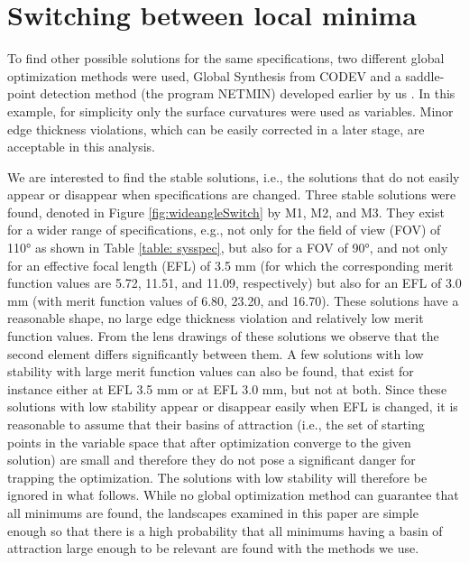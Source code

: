 \section{Switching between local minima}

To find other possible solutions for the same specifications, two different global optimization methods were used, Global Synthesis from CODEV \cite{KuperGO1992}\cite{RogersGO2006} and a saddle-point detection method (the program NETMIN) developed earlier by us \cite{MarinescuSPD07}. In this example, for simplicity only the surface curvatures were used as variables. Minor edge thickness violations, which can be easily corrected in a later stage, are acceptable in this analysis. 

We are interested to find the stable solutions, i.e., the solutions that do not easily appear or disappear when specifications are changed. Three stable solutions were found, denoted in Figure \ref{fig:wideangleSwitch} by M1, M2, and M3. They exist for a wider range of specifications, e.g., not only for the field of view (FOV) of 110° as shown in Table \ref{table: sysspec}, but also for a FOV of 90°, and not only for an effective focal length (EFL) of 3.5 mm (for which the corresponding merit function values are 5.72, 11.51, and 11.09, respectively) but also for an EFL of 3.0 mm (with merit function values of 6.80, 23.20, and 16.70). These solutions have a reasonable shape, no large edge thickness violation and relatively low merit function values. From the lens drawings of these solutions we observe that the second element differs significantly between them. A few solutions with low stability with large merit function values can also be found, that exist for instance either at EFL 3.5 mm or at EFL 3.0 mm, but not at both. Since these solutions with low stability appear or disappear easily when EFL is changed, it is reasonable to assume that their basins of attraction (i.e., the set of starting points in the variable space that after optimization converge to the given solution) are small and therefore they do not pose a significant danger for trapping the optimization. The solutions with low stability will therefore be ignored in what follows. While no global optimization method can guarantee that all minimums are found, the landscapes examined in this paper are simple enough so that there is a high probability that all minimums having a basin of attraction large enough to be relevant are found with the methods we use. 

